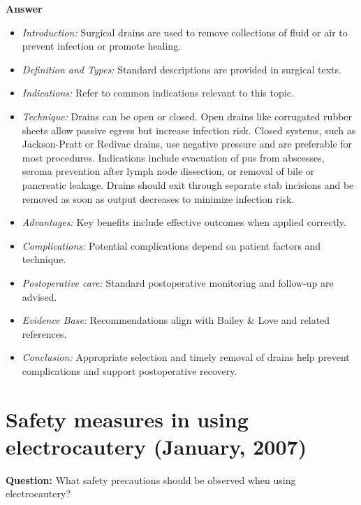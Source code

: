 \documentclass{article}
\begin{document}
\textbf{Answer}
\begin{itemize}

\item \emph{Introduction:} Surgical drains are used to remove collections of fluid or air to prevent infection or promote healing.
\item \emph{Definition and Types:} Standard descriptions are provided in surgical texts.
\item \emph{Indications:} Refer to common indications relevant to this topic.

\item \emph{Technique:} Drains can be open or closed. Open drains like corrugated rubber sheets allow passive egress but increase infection risk. Closed systems, such as Jackson-Pratt or Redivac drains, use negative pressure and are preferable for most procedures. Indications include evacuation of pus from abscesses, seroma prevention after lymph node dissection, or removal of bile or pancreatic leakage. Drains should exit through separate stab incisions and be removed as soon as output decreases to minimize infection risk.
\item \emph{Advantages:} Key benefits include effective outcomes when applied correctly.
\item \emph{Complications:} Potential complications depend on patient factors and technique.
\item \emph{Postoperative care:} Standard postoperative monitoring and follow-up are advised.
\item \emph{Evidence Base:} Recommendations align with Bailey \& Love and related references.

\item \emph{Conclusion:} Appropriate selection and timely removal of drains help prevent complications and support postoperative recovery.


\end{itemize}

\section{Safety measures in using electrocautery (January, 2007)}

\textbf{Question:} What safety precautions should be observed when using electrocautery?
\end{document}
